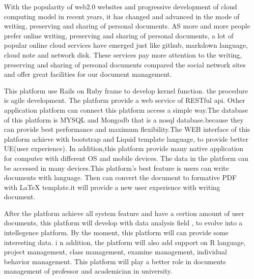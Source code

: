 \begin{eabstract}
With the popularity of web2.0 websites and progressive development of cloud computing model in recent years, it has changed and advanced in the mode of writing, preserving and sharing of personal documents. AS more and more people prefer online writing, preserving and sharing of personal documents, a lot of popular online cloud services have emerged just like github, markdown language, cloud note and network disk. These services pay more attention to the writing, preserving and sharing of personal documents compared the social network sites and offer great facilities for our document management.

This platform use Rails on Ruby frame to develop kernel function. the procedure is agile development.  The platform provide a web service of  RESTful api. Other application platform can connect this platform access a simple way.The database of this platform is MYSQL and Mongodb that is a nosql database.because they can provide best performance and maximum flexibility.The WEB interface of this platform achieve with bootstrap and Liquid template language, to provide better UE(user experience). In addition,this platform provide many native application for computer with different OS and mobile devices. The data in the platform can be accessed in many devices.This platform's best feature is users can write documents with  \smarkdown{} language. Then can convert the document to formative PDF  with \LaTeX{} template.it will provide a new user experience with writing document.

After the platform achieve all system  feature and have a certion amount of user documents, this platform will develop with data analysis field , to evolve into  a intellegence platform. By the moment, this platform will can provide some interesting data. i n addition, the platform will also add support on R language, project management, class management, examine management, individual behavior management. This platform will play a better role in documents management of professor and academician in university.
\end{eabstract}

